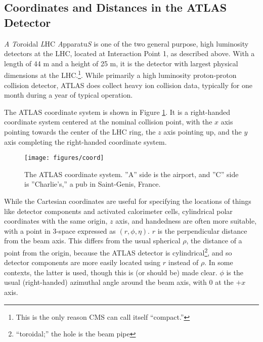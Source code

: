 \subsection{Coordinates and Distances in the ATLAS Detector}
\emph{A} \emph{T}oroidal \emph{L}HC \emph{A}pparatu\emph{S} is one of the two general purpose, high luminosity detectors at the LHC, located at Interaction Point 1, as described above.  With a length of 44 m and a height of 25 m, it is the detector with largest physical dimensions at the LHC.\footnote{This is the only reason CMS can call itself ``compact.''}.  While primarily a high luminosity proton-proton collision detector, ATLAS does collect heavy ion collision data, typically for one month during a year of typical operation.  

The ATLAS coordinate system is shown in Figure \ref{fig:acoord}.  It is a right-handed coordinate system centered at the nominal collision point, with the $x$ axis pointing towards the center of the LHC ring, the $z$ axis pointing up, and the $y$ axis completing the right-handed coordinate system.

\begin{figure}[!htbp]\captionsetup{justification=centering}
  \centering
  \texttt{[image: figures/coord]}
  \caption{The  ATLAS coordinate system.  ''A'' side is the airport, and ''C'' side is ''Charlie's,'' a pub in Saint-Genis, France.}
  \label{fig:acoord}
\end{figure}

While the Cartesian coordinates are useful for specifying the locations of things like detector components and activated calorimeter cells, cylindrical polar coordinates with the same origin, $z$ axis, and handedness are often more suitable, with a point in 3-space expressed as $\left(r,\phi,\eta\right)$.  $r$ is the perpendicular distance from the beam axis.  This differs from the usual spherical $\rho$, the distance of a point from the origin, because the ATLAS detector is cylindrical\footnote{``toroidal;'' the hole is the beam pipe}, and so detector components are more easily located using $r$ instead of $\rho$.  In some contexts, the latter is used, though this is (or should be) made clear.  $\phi$ is the usual (right-handed) azimuthal angle around the beam axis, with 0 at the $+x$ axis.

